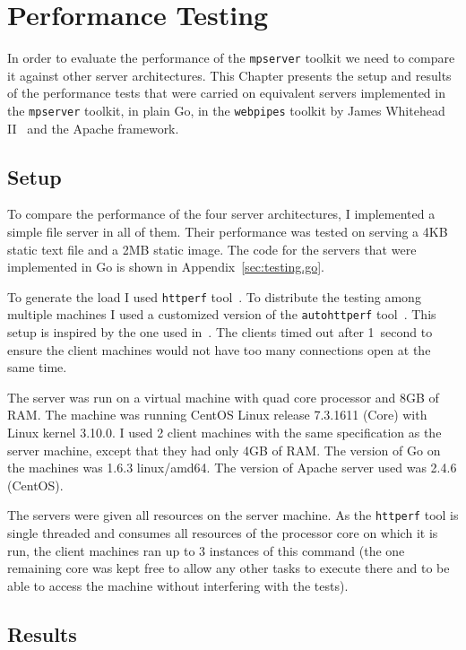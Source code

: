 \section{Performance Testing}
\label{sec:test}
In order to evaluate the performance of the \texttt{mpserver} toolkit we 
need to compare it against other server architectures.
This Chapter presents the setup and results of the performance tests
that were carried on equivalent servers implemented in the \texttt{mpserver} toolkit,
in plain Go, in the \texttt{webpipes} toolkit by James Whitehead II~\cite{whitehead} 
and the Apache framework.

\subsection{Setup}
To compare the performance of the four server architectures, I 
implemented a simple file server in all of them. Their performance 
was tested on serving a 4KB static text file and a 2MB static image. 
The code for the servers that were implemented in Go is shown in Appendix~\ref{sec:testing.go}. 

To generate the load I used \texttt{httperf} tool~\cite{httperf}. To distribute 
the testing among multiple machines I used a customized version
of the \texttt{autohttperf} tool~\cite{whitehead}.
This setup is inspired by the one used in~\cite{whitehead}.
The clients timed out after 1~second to ensure the client machines would 
not have too many connections open at the same time.

The server was run on a virtual machine with quad core processor and 
8GB of RAM. The machine was running CentOS Linux release 7.3.1611 (Core)
with Linux kernel 3.10.0.
I used 2 client machines with the same specification as the server machine, 
except that they had only 4GB of RAM. The version of Go on the machines was
1.6.3 linux/amd64. The version of Apache server used was 2.4.6 (CentOS).

The servers were given all resources on the server machine. 
As the \texttt{httperf} tool is single threaded and consumes 
all resources of the processor core on which it is run, the client 
machines ran up to 3 instances of this command (the one remaining 
core was kept free to allow any other tasks to execute there and to
be able to access the machine without interfering with the tests).

\subsection{Results}
